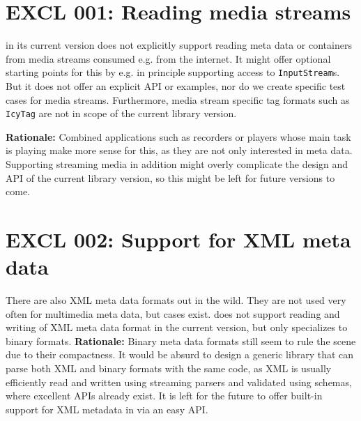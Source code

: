 
\section{EXCL 001: Reading media streams}
\label{sec:EXCL009LesenAusStreams}

\LibName{} in its current version \LibVersion{} does not explicitly support reading meta data or containers from media streams consumed e.g. from the internet. It might offer optional starting points for this by e.g. in principle supporting access to \texttt{InputStream}s. But it does not offer an explicit API or examples, nor do we create specific test cases for media streams. Furthermore, media stream specific tag formats such as \texttt{IcyTag} are not in scope of the current library version. 

\textbf{Rationale:} Combined applications such as recorders or players whose main task is playing make more sense for this, as they are not only interested in meta data. Supporting streaming media in addition might overly complicate the design and API of the current library version, so this might be left for future versions to come.


\section{EXCL 002: Support for  XML meta data}
\label{sec:EXCL010LesenVonXMLMetadaten}

There are also XML meta data formats out in the wild. They are not used very often for multimedia meta data, but cases exist. \LibName{} does not support reading and writing of XML meta data format in the current version, but only specializes to binary formats.
\textbf{Rationale:} Binary meta data formats still seem to rule the scene due to their compactness. It would be absurd to design a generic library that can parse both XML and binary formats with the same code, as XML is usually efficiently read and written using streaming parsers and validated using schemas, where excellent APIs already exist. It is left for the future to offer built-in support for XML metadata in \LibName{} via an easy API.


